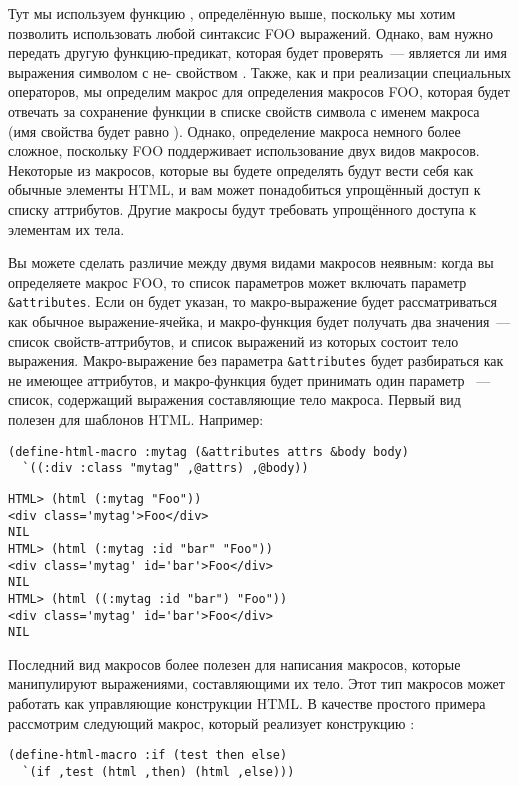 Тут мы используем функцию , определённую выше, поскольку мы хотим
позволить использовать любой синтаксис FOO выражений.  Однако, вам нужно передать другую
функцию-предикат, которая будет проверять~--- является ли имя выражения символом с
не- свойством .  Также, как и при реализации специальных
операторов, мы определим макрос для определения макросов FOO, которая будет отвечать за
сохранение функции в списке свойств символа с именем макроса (имя свойства будет равно
).  Однако, определение макроса немного более сложное, поскольку FOO
поддерживает использование двух видов макросов. Некоторые из макросов, которые вы будете
определять будут вести себя как обычные элементы HTML, и вам может понадобиться упрощённый
доступ к списку аттрибутов.  Другие макросы будут требовать упрощённого доступа к
элементам их тела.

Вы можете сделать различие между двумя видами макросов неявным: когда вы определяете
макрос FOO, то список параметров может включать параметр \lstinline!&attributes!.  Если он
будет указан, то макро-выражение будет рассматриваться как обычное выражение-ячейка, и
макро-функция будет получать два значения~--- список свойств-аттрибутов, и список выражений
из которых состоит тело выражения.  Макро-выражение без параметра \lstinline!&attributes!
будет разбираться как не имеющее аттрибутов, и макро-функция будет принимать один параметр
~--- список, содержащий выражения составляющие тело макроса.  Первый вид полезен для
шаблонов HTML. Например:

\begin{lstlisting}
(define-html-macro :mytag (&attributes attrs &body body)
  `((:div :class "mytag" ,@attrs) ,@body))
\end{lstlisting}

\begin{lstlisting}[style=lisprepl]
HTML> (html (:mytag "Foo"))
<div class='mytag'>Foo</div>
NIL
HTML> (html (:mytag :id "bar" "Foo"))
<div class='mytag' id='bar'>Foo</div>
NIL
HTML> (html ((:mytag :id "bar") "Foo"))
<div class='mytag' id='bar'>Foo</div>
NIL
\end{lstlisting}

Последний вид макросов более полезен для написания макросов, которые манипулируют
выражениями, составляющими их тело.  Этот тип макросов может работать как управляющие
конструкции HTML. В качестве простого примера рассмотрим следующий макрос, который
реализует конструкцию :

\begin{lstlisting}
(define-html-macro :if (test then else)
  `(if ,test (html ,then) (html ,else)))
\end{lstlisting}

